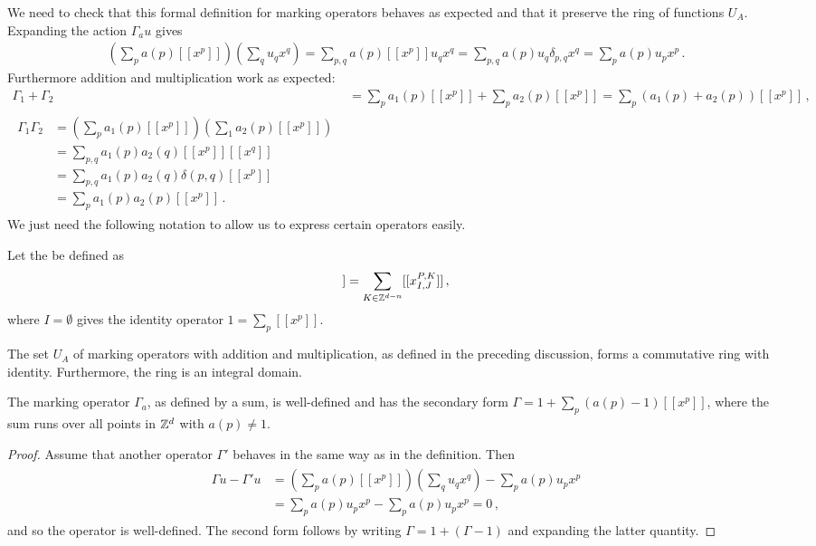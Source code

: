 We need to check that this formal definition for marking operators behaves as expected and that it preserve the ring of functions $U_A$. Expanding the action $\Gamma_a u$ gives
\begin{align}
	\left(\sum_p a(p)[[x^p]]\right)\left(\sum_q u_qx^q\right) = \sum_{p,q} a(p)[[x^p]]u_qx^q = \sum_{p,q}a(p)u_q\delta_{p,q}x^q = \sum_p a(p)u_p x^p\,.
\end{align}
Furthermore addition and multiplication work as expected:
\begin{align}
	\Gamma_1 + \Gamma_2 &= \sum_p a_1(p)[[ x^p]] + \sum_p a_2(p)[[ x^p]] = \sum_p (a_1(p) + a_2(p))[[x^p]]\,,\\
	\begin{split}
		\Gamma_1\Gamma_2 &= \left(\sum_p a_1(p)[[x^p]]\right)\left(\sum_1a_2(p)[[x^p]]\right)\\
					& = \sum_{p,q} a_1(p)a_2(q)[[x^p]][[x^q]]\\
					& = \sum_{p,q}a_1(p)a_2(q)\delta(p,q) [[x^p]]\\
					& = \sum_p a_1(p)a_2(p) [[x^p]]\,.
	\end{split}
\end{align}
We just need the following notation to allow us to express certain operators easily.
\begin{defn} Let the  be defined as
\begin{align}
	[[x_I^P]] = \sum_{K \in \ze^{d-n}}[[x_{I,J}^{P,K}]]\,,
\end{align}
where $I = \emptyset$ gives the identity operator $1 = \sum_p [[x^p]]$.
\end{defn}

\begin{prop} The set $U_A$ of marking operators with addition and multiplication, as defined in the preceding discussion, forms a commutative ring with identity. Furthermore, the ring is an integral domain.
\end{prop}

\begin{lem}The marking operator $\Gamma_a$, as defined by a sum, is well-defined and has the secondary form $\Gamma = 1 + \sum_p (a(p)-1)[[x^p]]$, where the sum runs over all points in $\mathbb{Z}^d$ with $a(p) \neq 1$.
\end{lem}
\begin{proof} Assume that another operator $\Gamma'$ behaves in the same way as in the definition. Then
\begin{align}
	\begin{split}
		\Gamma u -\Gamma'u &= \left(\sum_p a(p) [[x^p]]\right)\left(\sum_q u_q x^q\right) - \sum_p a(p)u_p x^p \\
					&= \sum_p a(p)u_p x^p - \sum_p a(p)u_p x^p = 0\,,
	\end{split}
\end{align}
and so the operator is well-defined. The second form follows by writing $\Gamma = 1 + (\Gamma - 1)$ and expanding the latter quantity.
\end{proof}

